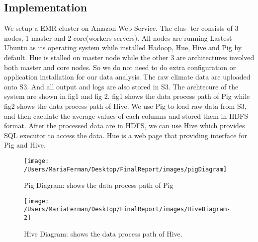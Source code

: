 \subsection{Implementation}
We setup a EMR cluster on Amazon Web Service. The clus- ter consists of 3 nodes, 1 master and 2 core(workers servers). All nodes are running Lastest Ubuntu as its operating system while installed Hadoop, Hue, Hive and Pig by default. Hue is stalled on master node while the other 3 are architectures involved both master and core nodes. So we do not need to do extra configuration or application installation for our data analysis. The raw climate data are uploaded onto S3. And all output and logs are also stored in S3. The archtecure of the system are shown in fig1 and fig 2. fig1 shows the data process path of Pig while fig2 shows the data process path of Hive. We use Pig to load raw data from S3, and then caculate the average values of each columns and stored them in HDFS format. After the processed data are in HDFS, we can use Hive which provides SQL executor to access the data. Hue is a web page that providing interface for Pig and Hive.

\begin{figure*}[H]
	\begin{center}
		\texttt{[image: /Users/MariaFerman/Desktop/FinalReport/images/pigDiagram]}
		\caption{Pig Diagram: shows the data process path of Pig}
		\label{fig:dataDiagr1}
	\end{center}
	\vspace{-10pt}
\end{figure*}


\begin{figure*}[H]
	\begin{center}
		\texttt{[image: /Users/MariaFerman/Desktop/FinalReport/images/HiveDiagram-2]}
		\caption{Hive Diagram: shows the data process path of Hive.}
		\label{fig:dataDiagr3}
	\end{center}
	\vspace{-10pt}
\end{figure*}